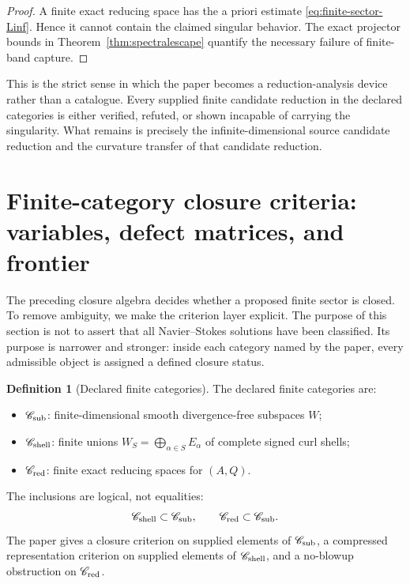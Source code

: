 \documentclass[aps,prd,reprint,superscriptaddress,nofootinbib,floatfix]{revtex4-2}
\theoremstyle{definition}
\newtheorem{definition}[theorem]{Definition}
\theoremstyle{remark}
\begin{document}
\begin{proof}
	A finite exact reducing space has the a priori estimate \eqref{eq:finite-sector-Linf}.  Hence it cannot contain the claimed singular behavior.  The exact projector bounds in Theorem~\ref{thm:spectralescape} quantify the necessary failure of finite-band capture.
\end{proof}

This is the strict sense in which the paper becomes a reduction-analysis device rather than a catalogue.  Every supplied finite candidate reduction in the declared categories is either verified, refuted, or shown incapable of carrying the singularity.  What remains is precisely the infinite-dimensional source candidate reduction and the curvature transfer of that candidate reduction.



\section{Finite-category closure criteria: variables, defect matrices, and frontier}
\label{sec:finitecriteria}

The preceding closure algebra decides whether a proposed finite sector is closed.  To remove ambiguity, we make the criterion layer explicit.  The purpose of this section is not to assert that all Navier--Stokes solutions have been classified.  Its purpose is narrower and stronger: inside each category named by the paper, every admissible object is assigned a defined closure status.

\begin{definition}[Declared finite categories]
	The declared finite categories are:
	\begin{itemize}[leftmargin=*]
		\item \(\mathscr C_{\rm sub}\): finite-dimensional smooth divergence-free subspaces \(W\);
		\item \(\mathscr C_{\rm shell}\): finite unions \(W_S=\bigoplus_{\alpha\in S}E_\alpha\) of complete signed curl shells;
		\item \(\mathscr C_{\rm red}\): finite exact reducing spaces for \((A,Q)\).
	\end{itemize}
	The inclusions are logical, not equalities:
	\[
		\mathscr C_{\rm shell}\subset\mathscr C_{\rm sub},\qquad
		\mathscr C_{\rm red}\subset\mathscr C_{\rm sub}.
	\]
	The paper gives a closure criterion on supplied elements of \(\mathscr C_{\rm sub}\), a compressed representation criterion on supplied elements of \(\mathscr C_{\rm shell}\), and a no-blowup obstruction on \(\mathscr C_{\rm red}\).
\end{definition}
\end{document}
